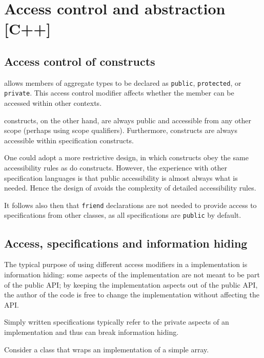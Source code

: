 \section{Access control and abstraction [C++]}
\label{sec:access}

\subsection{Access control of \NAME constructs}

\lang allows members of aggregate types to be declared as \lstinline|public|, \lstinline|protected|, or \lstinline|private|. This access control modifier affects whether the member can be accessed within other contexts. 

\NAME constructs, on the other hand, are always public and accessible from any other scope (perhaps using scope qualifiers). 
Furthermore, \lang constructs are always accessible within \NAME
specification constructs.

One could adopt a more restrictive design, in which \NAME constructs
obey the same accessibility rules as do \lang constructs. 
However, the experience with other specification languages is that 
public accessibility is almost always what is needed. Hence the design
of \NAME avoids the complexity of detailed accessibility rules.

It follows also then that \lstinline|friend| declarations are not 
needed to provide access to \NAME specifications from other classes,
as all specifications are \lstinline|public| by default.
 
\subsection{Access, specifications and information hiding}
\label{sec:infohiding}

The typical purpose of using different access modifiers in a
\lang implementation is information hiding: some aspects of
the implementation are not meant to be part of the public API;
by keeping the implementation aspects out of the public API, the
author of the code is free to change the implementation without
affecting the API.

Simply written specifications typically refer to the private
aspects of an implementation and thus can break information hiding.

Consider a class that wraps an implementation of a simple array.



